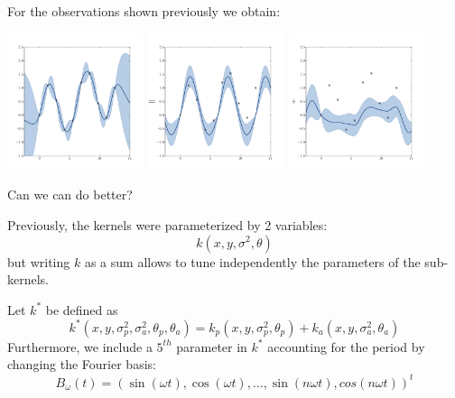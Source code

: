 \documentclass{beamer}
\begin{document}
\begin{frame}{}
\begin{example}
For the observations shown previously we obtain:
\begin{center}
 \includegraphics[height=4cm]{figures/Fig2-m} \includegraphics[height=4cm]{figures/Fig2-mp} \includegraphics[height=4cm]{figures/Fig2-ma}
\end{center}
\end{example}
Can we can do better?\\ 
\end{frame}

\begin{frame}{}
\begin{block}{}
Previously, the kernels were parameterized by 2 variables: 
\begin{equation*}
 k(x,y,\sigma^2, \theta)
\end{equation*}
but writing $k$ as a sum allows to tune independently the parameters of the sub-kernels.
\end{block}
Let $k^*$ be defined as
\begin{equation*}
 k^*(x,y,\sigma^2_p,\sigma^2_a, \theta_p, \theta_a) = k_p(x,y,\sigma^2_p, \theta_p) + k_a(x,y,\sigma^2_a, \theta_a)
\end{equation*}
Furthermore, we include a $5^{th}$ parameter in $k^*$ accounting for the period by changing the Fourier basis:
\begin{equation*}
 B_\omega(t) = (\sin(\omega t), \cos(\omega t), \dots, \sin(n \omega t), cos(n \omega t))^t
\end{equation*}
\end{frame}
\end{document}
